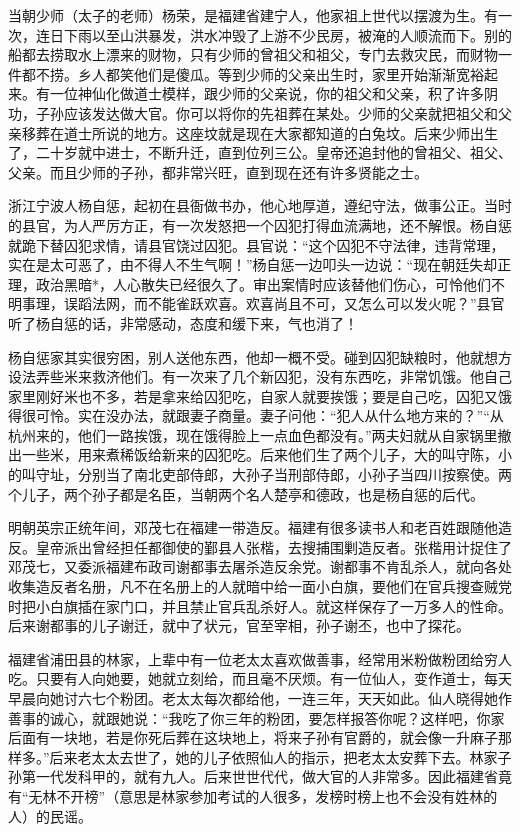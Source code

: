 \documentclass[12pt,UTF8]{ctexbook}
\begin{document}
当朝少师（太子的老师）杨荣，是福建省建宁人，他家祖上世代以摆渡为生。有一次，连日下雨以至山洪暴发，洪水冲毁了上游不少民房，被淹的人顺流而下。别的船都去捞取水上漂来的财物，只有少师的曾祖父和祖父，专门去救灾民，而财物一件都不捞。乡人都笑他们是傻瓜。等到少师的父亲出生时，家里开始渐渐宽裕起来。有一位神仙化做道士模样，跟少师的父亲说，你的祖父和父亲，积了许多阴功，子孙应该发达做大官。你可以将你的先祖葬在某处。少师的父亲就把祖父和父亲移葬在道士所说的地方。这座坟就是现在大家都知道的白兔坟。后来少师出生了，二十岁就中进士，不断升迁，直到位列三公。皇帝还追封他的曾祖父、祖父、父亲。而且少师的子孙，都非常兴旺，直到现在还有许多贤能之士。

浙江宁波人杨自惩，起初在县衙做书办，他心地厚道，遵纪守法，做事公正。当时的县官，为人严厉方正，有一次发怒把一个囚犯打得血流满地，还不解恨。杨自惩就跪下替囚犯求情，请县官饶过囚犯。县官说：“这个囚犯不守法律，违背常理，实在是太可恶了，由不得人不生气啊！”杨自惩一边叩头一边说：“现在朝廷失却正理，政治黑暗*，人心散失已经很久了。审出案情时应该替他们伤心，可怜他们不明事理，误蹈法网，而不能雀跃欢喜。欢喜尚且不可，又怎么可以发火呢？”县官听了杨自惩的话，非常感动，态度和缓下来，气也消了！

杨自惩家其实很穷困，别人送他东西，他却一概不受。碰到囚犯缺粮时，他就想方设法弄些米来救济他们。有一次来了几个新囚犯，没有东西吃，非常饥饿。他自己家里刚好米也不多，若是拿来给囚犯吃，自家人就要挨饿；要是自己吃，囚犯又饿得很可怜。实在没办法，就跟妻子商量。妻子问他：“犯人从什么地方来的？”“从杭州来的，他们一路挨饿，现在饿得脸上一点血色都没有。”两夫妇就从自家锅里撤出一些米，用来煮稀饭给新来的囚犯吃。后来他们生了两个儿子，大的叫守陈，小的叫守址，分别当了南北吏部侍郎，大孙子当刑部侍郎，小孙子当四川按察使。两个儿子，两个孙子都是名臣，当朝两个名人楚亭和德政，也是杨自惩的后代。

明朝英宗正统年间，邓茂七在福建一带造反。福建有很多读书人和老百姓跟随他造反。皇帝派出曾经担任都御使的鄞县人张楷，去搜捕围剿造反者。张楷用计捉住了邓茂七，又委派福建布政司谢都事去屠杀造反余党。谢都事不肯乱杀人，就向各处收集造反者名册，凡不在名册上的人就暗中给一面小白旗，要他们在官兵搜查贼党时把小白旗插在家门口，并且禁止官兵乱杀好人。就这样保存了一万多人的性命。后来谢都事的儿子谢迁，就中了状元，官至宰相，孙子谢丕，也中了探花。

福建省浦田县的林家，上辈中有一位老太太喜欢做善事，经常用米粉做粉团给穷人吃。只要有人向她要，她就立刻给，而且毫不厌烦。有一位仙人，变作道士，每天早晨向她讨六七个粉团。老太太每次都给他，一连三年，天天如此。仙人晓得她作善事的诚心，就跟她说：“我吃了你三年的粉团，要怎样报答你呢？这样吧，你家后面有一块地，若是你死后葬在这块地上，将来子孙有官爵的，就会像一升麻子那样多。”后来老太太去世了，她的儿子依照仙人的指示，把老太太安葬下去。林家子孙第一代发科甲的，就有九人。后来世世代代，做大官的人非常多。因此福建省竟有“无林不开榜”（意思是林家参加考试的人很多，发榜时榜上也不会没有姓林的人）的民谣。
\end{document}
